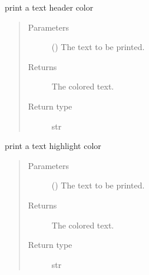 \documentclass[a4paper,10pt,english]{sphinxmanual}
\begin{document}

\begin{fulllineitems}
\label{\detokenize{commands/apidoc/src:src.printcolors.printcHeader}}
print a text header color
\begin{quote}\begin{description}
\item[{Parameters}] \leavevmode
{} () \textendash{} The text to be printed.

\item[{Returns}] \leavevmode
The colored text.

\item[{Return type}] \leavevmode
str

\end{description}\end{quote}

\end{fulllineitems}


\begin{fulllineitems}
\label{\detokenize{commands/apidoc/src:src.printcolors.printcHighlight}}
print a text highlight color
\begin{quote}\begin{description}
\item[{Parameters}] \leavevmode
{} () \textendash{} The text to be printed.

\item[{Returns}] \leavevmode
The colored text.

\item[{Return type}] \leavevmode
str

\end{description}\end{quote}

\end{fulllineitems}

\end{document}
